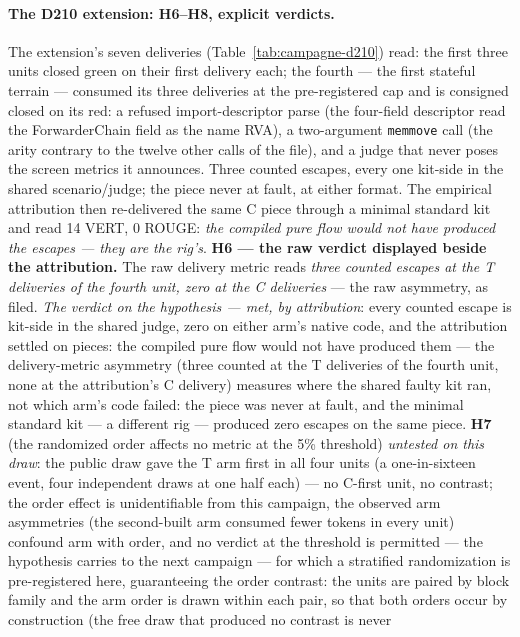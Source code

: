 \documentclass[10pt,a4paper]{article}
\newcommand{\code}[1]{\texttt{\small #1}}
\begin{document}
\paragraph{The D210 extension: H6--H8, explicit verdicts.} The
extension's seven deliveries (Table~\ref{tab:campagne-d210}) read:
the first three units closed green on their first delivery each; the
fourth --- the first stateful terrain --- consumed its three
deliveries at the pre-registered cap and is consigned closed on its
red: a refused import-descriptor parse (the four-field descriptor
read the ForwarderChain field as the name RVA), a two-argument
\code{memmove} call (the arity contrary to the twelve other calls of
the file), and a judge that never poses the screen metrics it
announces. Three counted escapes, every one kit-side in the shared
scenario/judge; the piece never at fault, at either format. The
empirical attribution then re-delivered the same C piece through a
minimal standard kit and read 14 VERT, 0 ROUGE: \emph{the compiled
pure flow would not have produced the escapes --- they are the
rig's}. \textbf{H6 --- the raw verdict displayed beside the attribution.}
The raw delivery metric reads \emph{three counted escapes at the T
deliveries of the fourth unit, zero at the C deliveries} --- the raw
asymmetry, as filed. \emph{The verdict on the hypothesis --- met,
by attribution}:
every counted escape is kit-side in the shared judge, zero on either
arm's native code, and the attribution settled on pieces: the
compiled pure flow would not have produced them --- the
delivery-metric asymmetry (three counted at the T deliveries of the
fourth unit, none at the attribution's C delivery) measures where the
shared faulty kit ran, not which arm's code failed: the piece was
never at fault, and the minimal standard kit --- a different rig ---
produced zero escapes on the same piece. \textbf{H7} (the randomized
order affects no metric at the 5\% threshold) \emph{untested on this
draw}: the public draw gave the T arm first in all four units (a
one-in-sixteen event, four independent draws at one half each) --- no
C-first unit, no contrast; the order effect is unidentifiable from
this campaign, the observed arm asymmetries (the second-built arm
consumed fewer tokens in every unit) confound arm with order, and no
verdict at the threshold is permitted --- the hypothesis carries to the next campaign --- for which a
stratified randomization is pre-registered here, guaranteeing the
order contrast: the units are paired by block family and the arm
order is drawn within each pair, so that both orders occur by
construction (the free draw that produced no contrast is never
\end{document}
